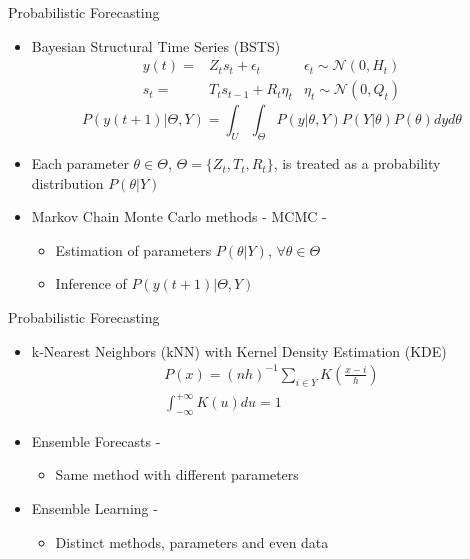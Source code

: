 \documentclass{beamer}
\begin{document}
\begin{frame}{Probabilistic Forecasting}
\begin{itemize}
\item Bayesian Structural Time Series (BSTS) \cite{Scott2014}
$$
\begin{array}{rlc}
    y(t)  = & Z_ts_t + \epsilon_t & \epsilon_t \sim \mathcal{N}(0, H_t) \\
    s_t  = & T_t s_{t-1} + R_t\eta_t & \eta_t \sim \mathcal{N}(0, Q_t)
\end{array}
$$
$$
    P(y(t+1)|\Theta,Y) =  \int_U \int_\Theta P(y|\theta,Y)P(Y|\theta)P(\theta) dy d\theta
$$

\item Each parameter $\theta \in \Theta$, $\Theta= \{Z_t, T_t, R_t\}$, is treated as a probability distribution $P(\theta|Y)$
\item  Markov Chain Monte Carlo methods - MCMC -  \cite{Hastings1970}
\begin{itemize}
    \item Estimation of parameters $P(\theta|Y)$, $\forall \theta \in \Theta$
    \item Inference of $P(y(t+1)|\Theta,Y)$
\end{itemize}
\end{itemize}
\end{frame}



\begin{frame}{Probabilistic Forecasting}
\linespread{2}
\begin{itemize}
\item k-Nearest Neighbors (kNN) with Kernel Density Estimation (KDE)
$$
\begin{array}{}
    P(x) = (nh)^{-1} \sum_{i \in Y} K\left(\frac{x - i}{h}\right)   \\
     \int_{-\infty}^{+\infty}K(u) du = 1 
\end{array}
$$

\item Ensemble Forecasts - \cite{Gneiting2008}
\begin{itemize}
\item Same method with different parameters
\end{itemize}
\item Ensemble Learning - \cite{Mohammed2016}
\begin{itemize}
\item Distinct methods, parameters and even data
\end{itemize}
\end{itemize}
\end{frame}
\end{document}

